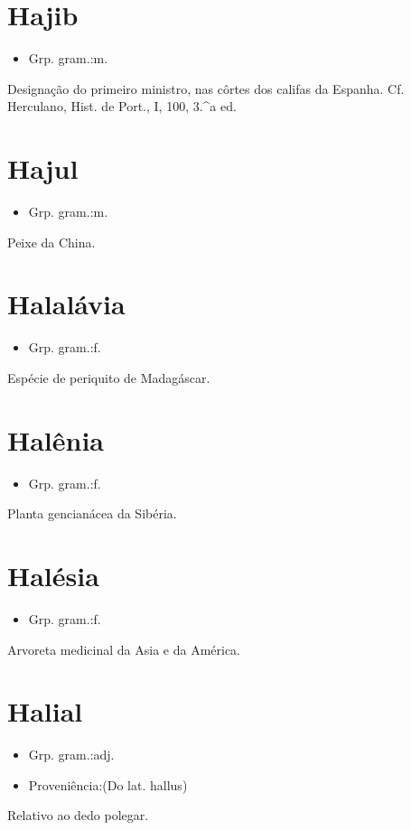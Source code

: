 \documentclass{article}
\begin{document}
\section{Hajib}
\begin{itemize}
\item {Grp. gram.:m.}
\end{itemize}
Designação do primeiro ministro, nas côrtes dos califas da Espanha. Cf. Herculano, \textunderscore Hist. de Port.\textunderscore , I, 100, 3.^a ed.
\section{Hajul}
\begin{itemize}
\item {Grp. gram.:m.}
\end{itemize}
Peixe da China.
\section{Halalávia}
\begin{itemize}
\item {Grp. gram.:f.}
\end{itemize}
Espécie de periquito de Madagáscar.
\section{Halênia}
\begin{itemize}
\item {Grp. gram.:f.}
\end{itemize}
Planta gencianácea da Sibéria.
\section{Halésia}
\begin{itemize}
\item {Grp. gram.:f.}
\end{itemize}
Arvoreta medicinal da Asia e da América.
\section{Halial}
\begin{itemize}
\item {Grp. gram.:adj.}
\end{itemize}
\begin{itemize}
\item {Proveniência:(Do lat. \textunderscore hallus\textunderscore )}
\end{itemize}
Relativo ao dedo polegar.
\end{document}
